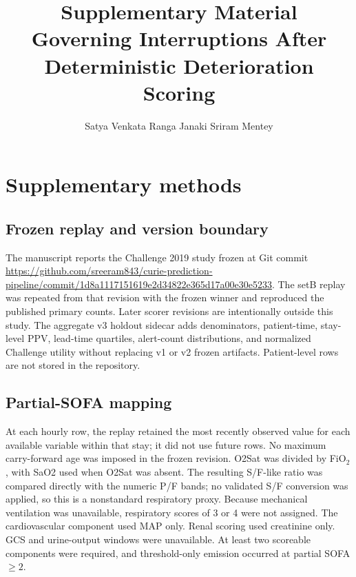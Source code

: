 \documentclass[11pt]{article}
\title{Supplementary Material\\Governing Interruptions After Deterministic Deterioration Scoring}
\author{Satya Venkata Ranga Janaki Sriram Mentey}
\date{}
\begin{document}
\maketitle

\section*{Supplementary methods}

\subsection*{Frozen replay and version boundary}
The manuscript reports the Challenge 2019 study frozen at Git commit
\url{https://github.com/sreeram843/curie-prediction-pipeline/commit/1d8a1117151619e2d34822e365d17a00e30e5233}.
The setB replay was repeated
from that revision with the frozen winner and reproduced the published primary
counts. Later scorer revisions are intentionally outside this study. The
aggregate v3 holdout sidecar adds denominators, patient-time, stay-level PPV,
lead-time quartiles, alert-count distributions, and normalized Challenge utility
without replacing v1 or v2 frozen artifacts. Patient-level rows are not stored
in the repository.

\subsection*{Partial-SOFA mapping}
At each hourly row, the replay retained the most recently observed value for
each available variable within that stay; it did not use future rows. No maximum
carry-forward age was imposed in the frozen revision. O2Sat was divided by
FiO$_2$, with SaO2 used when O2Sat was absent. The resulting S/F-like ratio was
compared directly with the numeric P/F bands; no validated S/F conversion was
applied, so this is a nonstandard respiratory proxy. Because
mechanical ventilation was unavailable, respiratory scores of 3 or 4 were not
assigned. The cardiovascular component used MAP only. Renal scoring used
creatinine only. GCS and urine-output windows were unavailable. At least two
scoreable components were required, and threshold-only emission occurred at
partial SOFA $\geq2$.
\end{document}
